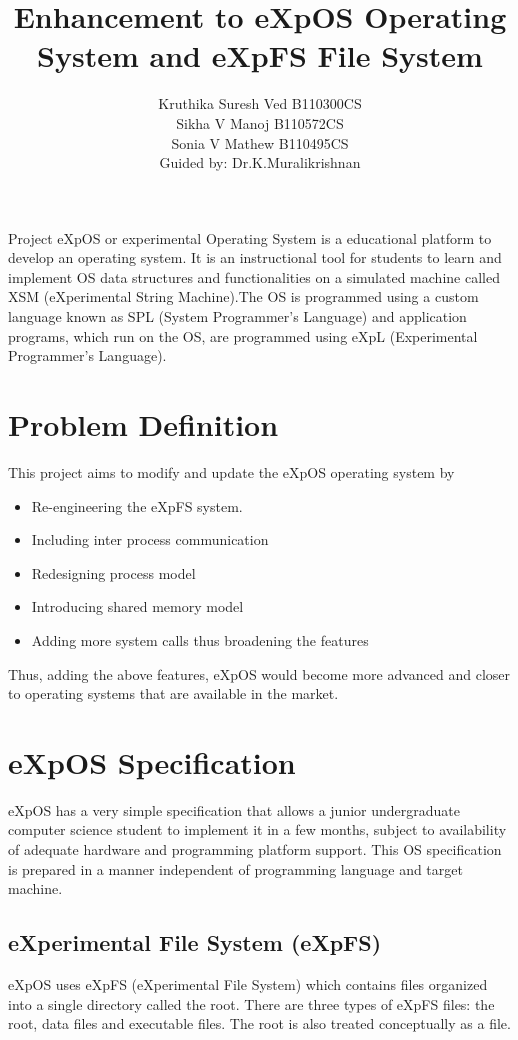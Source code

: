 \documentclass[10pt]{article}
\title{Enhancement to eXpOS Operating System and eXpFS File System}
\author{ Kruthika Suresh Ved     B110300CS\\  Sikha V Manoj     B110572CS\\  Sonia V Mathew    B110495CS\\ Guided by: Dr.K.Muralikrishnan}
\begin{document}
	
\maketitle
	

\abstract{} 

Project eXpOS or experimental Operating System is a educational platform to develop an operating system. It is an instructional tool for students to learn and implement OS data structures and functionalities on a simulated machine called XSM (eXperimental String Machine).The OS is programmed using a custom language known as SPL (System Programmer's Language) and application programs, which run on the OS, are programmed using eXpL (Experimental Programmer's Language).


\section{Problem Definition}

This project aims to modify and update the eXpOS operating system by
\begin{itemize}
\item Re-engineering the eXpFS system. 
\item Including inter process communication
\item Redesigning process model 
\item Introducing shared memory model 
\item Adding more system calls thus broadening the features
\end {itemize}
Thus, adding the above features, eXpOS would become more advanced and closer to operating systems that are available in the market.
\section{eXpOS Specification}

eXpOS has a very simple specification that allows a junior undergraduate computer science student to implement it in a few months, subject to availability of adequate hardware and programming platform support. This OS specification is prepared in a manner independent of programming language and target machine.
\subsection{eXperimental File System (eXpFS)}

eXpOS uses eXpFS (eXperimental File System) which contains files organized into a single directory called the root. There are three types of eXpFS files: the root, data files and executable files. The root is also treated conceptually as a file.
\end{document}
